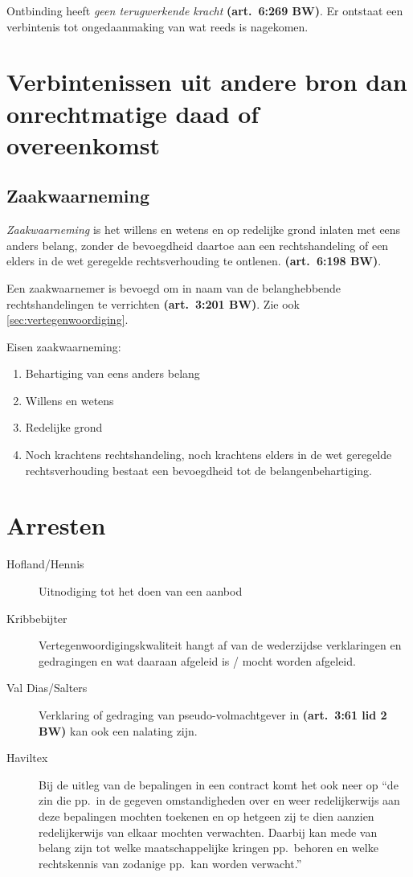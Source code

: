 \documentclass[a4paper]{article}
\newcommand{\art}[1]{\textbf{(art.~#1 BW)}\xspace}
\begin{document}
Ontbinding heeft \emph{geen terugwerkende kracht} \art{6:269}. Er ontstaat een
verbintenis tot ongedaanmaking van wat reeds is nagekomen.

\section{Verbintenissen uit andere bron dan onrechtmatige daad of overeenkomst}

\subsection{Zaakwaarneming}

\emph{Zaakwaarneming} is het willens en wetens en op redelijke grond inlaten
met eens anders belang, zonder de bevoegdheid daartoe aan een rechtshandeling
of een elders in de wet geregelde rechtsverhouding te ontlenen. \art{6:198}.

Een zaakwaarnemer is bevoegd om in naam van de belanghebbende
rechtshandelingen te verrichten \art{3:201}. Zie ook
\ref{sec:vertegenwoordiging}.

Eisen zaakwaarneming:
\begin{enumerate}
  \item Behartiging van eens anders belang
  \item Willens en wetens
  \item Redelijke grond
  \item Noch krachtens rechtshandeling, noch krachtens elders in de wet
    geregelde rechtsverhouding bestaat een bevoegdheid tot de
    belangenbehartiging.
\end{enumerate}

\section{Arresten}

\begin{description}

  \item[Hofland/Hennis] Uitnodiging tot het doen van een aanbod

  \item[Kribbebijter] Vertegenwoordigingskwaliteit hangt af van de wederzijdse
    verklaringen en gedragingen en wat daaraan afgeleid is / mocht worden
    afgeleid.

  \item[Val Dias/Salters] Verklaring of gedraging van pseudo-volmachtgever in
    \art{3:61 lid 2} kan ook een nalating zijn.

  \item[Haviltex] Bij de uitleg van de bepalingen in een contract komt het ook
    neer op ``de zin die pp.~in de gegeven omstandigheden over en weer
    redelijkerwijs aan deze bepalingen mochten toekenen en op hetgeen zij te
    dien aanzien redelijkerwijs van elkaar mochten verwachten. Daarbij kan
    mede van belang zijn tot welke maatschappelijke kringen pp.~behoren en
    welke rechtskennis van zodanige pp.~kan worden verwacht.''

\end{description}
\end{document}
